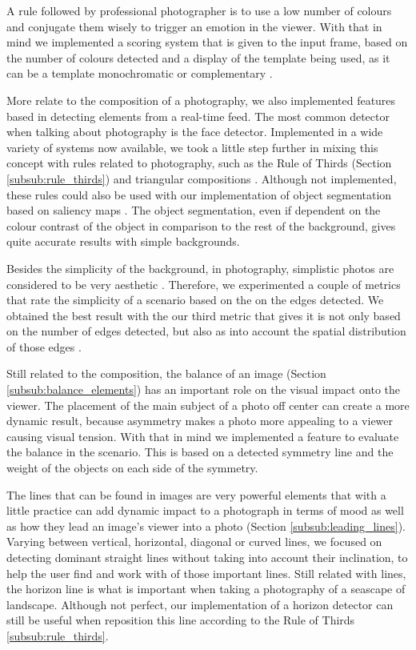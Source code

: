 A rule followed by professional photographer is to use a low number of colours and conjugate them wisely to trigger an emotion in the viewer. With that in mind we implemented a scoring system that is given to the input frame, based on the number of colours detected and a display of the template being used, as it can be a template monochromatic or complementary \cite{cohen2006color}.

More relate to the composition of a photography, we also implemented features based in detecting elements from a real-time feed. The most common detector when talking about photography is the face detector\cite{OCV}. Implemented in a wide variety of systems now available, we took a little step further in mixing this concept with rules related to photography, such as the Rule of Thirds (Section \ref{subsub:rule_thirds}) and triangular compositions \cite{Santos}. Although not implemented, these rules could also be used with our implementation of object segmentation based on saliency maps \cite{cheng2011global}. The object segmentation, even if dependent on the colour contrast of the object in comparison to the rest of the background, gives quite accurate results with simple backgrounds.

Besides the simplicity of the background, in photography, simplistic photos are considered to be very aesthetic \cite{kamps2012rules}. Therefore, we experimented a couple of metrics that rate the simplicity of a scenario based on the on the edges detected. We obtained the best result with the our third metric that gives it is not only based on the number of edges detected, but also as into account the spatial distribution of those edges \cite{ke2006design}.

Still related to the composition, the balance of an image (Section \ref{subsub:balance_elements}) has an important role on the visual impact onto the viewer. The placement of the main subject of a photo off center can create a more dynamic result, because asymmetry makes a photo more appealing to a viewer causing visual tension. With that in mind we implemented a feature to evaluate the balance in the scenario. This is based on a detected symmetry line and the weight of the objects on each side of the symmetry.

The lines that can be found in images are very powerful elements that with a little practice can add dynamic impact to a photograph in terms of mood as well as how they lead an image’s viewer into a photo (Section \ref{subsub:leading_lines}). Varying between vertical, horizontal, diagonal or curved lines, we focused on detecting dominant straight lines without taking into account their inclination, to help the user find and work with of those important lines. Still related with lines, the horizon line is what is important when taking a photography of a seascape of landscape. Although not perfect, our implementation of a horizon detector \cite{zafarifar2008horizon} can still be useful when reposition this line according to the Rule of Thirds \ref{subsub:rule_thirds}.
